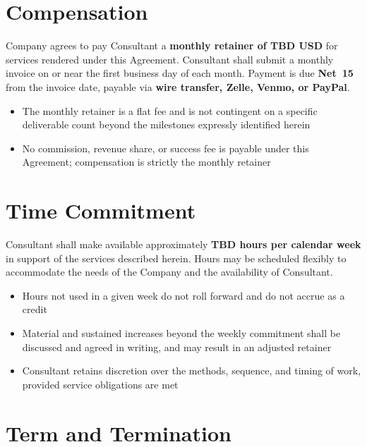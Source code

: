 \documentclass{toospoint}
\begin{document}
\section{Compensation}

Company agrees to pay Consultant a \textbf{monthly retainer of TBD USD}
for services rendered under this Agreement. Consultant shall submit a monthly
invoice on or near the first business day of each month. Payment is due
\textbf{Net~15} from the invoice date, payable via \textbf{wire transfer,
Zelle, Venmo, or PayPal}.

\begin{itemize}[leftmargin=1.5em, itemsep=4pt, topsep=4pt]
  \item The monthly retainer is a flat fee and is not contingent on a specific deliverable count beyond the milestones expressly identified herein
  \item No commission, revenue share, or success fee is payable under this Agreement; compensation is strictly the monthly retainer
\end{itemize}

\section{Time Commitment}

Consultant shall make available approximately \textbf{TBD hours per calendar
week} in support of the services described herein. Hours may be scheduled
flexibly to accommodate the needs of the Company and the availability of
Consultant.

\begin{itemize}[leftmargin=1.5em, itemsep=4pt, topsep=4pt]
  \item Hours not used in a given week do not roll forward and do not accrue as a credit
  \item Material and sustained increases beyond the weekly commitment shall be discussed and agreed in writing, and may result in an adjusted retainer
  \item Consultant retains discretion over the methods, sequence, and timing of work, provided service obligations are met
\end{itemize}

\section{Term and Termination}
\end{document}
